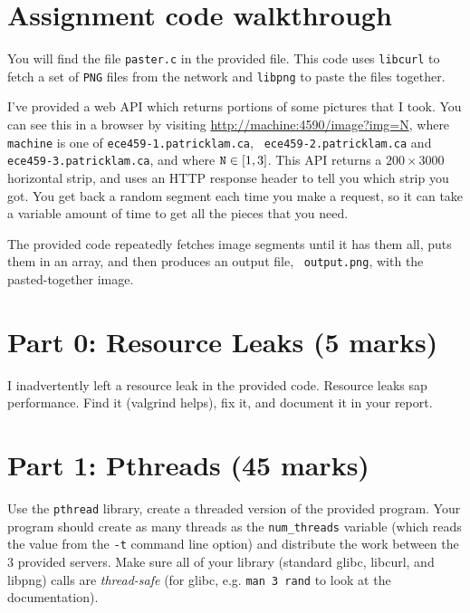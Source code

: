 \documentclass[letterpaper,10pt]{article}
\begin{document}

\section*{Assignment code walkthrough}

You will find the file {\tt paster.c} in the provided file. This code uses
{\tt libcurl} to fetch a set of {\tt PNG} files from the network and {\tt libpng}
to paste the files together.

I've provided a web API which returns portions of some pictures that I took.
You can see this in a browser by visiting 
\url{http://machine:4590/image?img=N},
where {\tt machine} is one of {\tt ece459-1.patricklam.ca}, {\tt
  ece459-2.patricklam.ca} and {\tt ece459-3.patricklam.ca}, and where $\mbox{\tt N} \in [1,3]$. This API returns a $200 \times 3000$ horizontal strip, and uses
an HTTP response header to tell you which strip you got. You get back a random
segment each time you make a request, so it can take a variable amount of time to get all the pieces that you need.

The provided code repeatedly fetches image segments until it has them
all, puts them in an array, and then produces an output file, {\tt
  output.png}, with the pasted-together image.

\newpage

\section*{Part 0: Resource Leaks (5 marks)}

I inadvertently left a resource leak in the provided code. Resource
leaks sap performance. Find it (valgrind helps), fix it, and document
it in your report.

\section*{Part 1: Pthreads (45 marks)}

Use the {\tt pthread} library, create a threaded version of the
provided program.  Your program should create as many threads as the
{\tt num\_threads} variable (which reads the value from the {\tt -t}
command line option) and distribute the work between the 3 provided
servers. Make sure all of your library (standard glibc, libcurl, and
libpng) calls are {\it thread-safe} (for glibc, e.g. {\tt man 3 rand} to
look at the documentation).  
\end{document}
